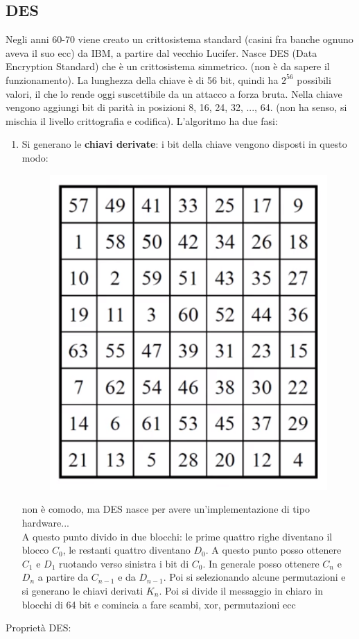 \subsection*{DES}
Negli anni 60-70 viene creato un crittosistema standard (casini fra banche ognuno aveva il suo ecc) da IBM, a partire dal vecchio Lucifer.
Nasce DES (Data Encryption Standard) che è un crittosistema simmetrico. (non è da sapere il funzionamento).
La lunghezza della chiave è di 56 bit, quindi ha $2^{56}$ possibili valori, il che lo rende oggi suscettibile da un attacco a forza bruta. Nella chiave vengono aggiungi bit di parità in posizioni 8, 16, 24, 32, ..., 64. (non ha senso, si mischia il livello crittografia e codifica).
L'algoritmo ha due fasi:
\begin{enumerate}
	\item Si generano le \textbf{chiavi derivate}: i bit della chiave vengono disposti in questo modo:
	\begin{figure}[h]
		\centering
		\includegraphics[width=0.5\linewidth]{immagini/img34}
	\end{figure}
	non è comodo, ma DES nasce per avere un'implementazione di tipo hardware...\\
	A questo punto divido in due blocchi: le prime quattro righe diventano il blocco $C_0$, le restanti quattro diventano $D_0$.
	A questo punto posso ottenere $C_1$ e $D_1$ ruotando verso sinistra i bit di $C_0$. In generale posso ottenere $C_n$ e $D_n$ a partire da $C_{n-1}$ e da $D_{n-1}$.
	Poi si selezionando alcune permutazioni e si generano le chiavi derivati $K_n$.
	Poi si divide il messaggio in chiaro in blocchi di 64 bit e comincia a fare scambi, xor, permutazioni ecc
\end{enumerate}
Proprietà DES:
